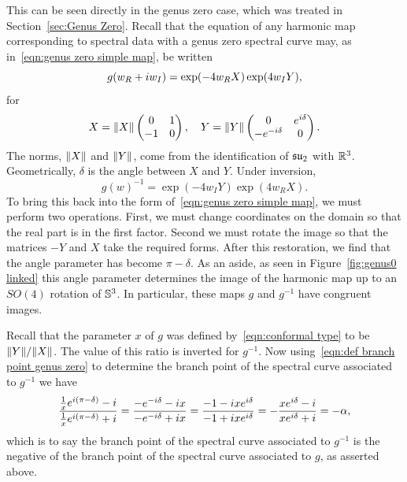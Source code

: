 \documentclass{article}
\begin{document}
This can be seen directly in the genus zero case, which was treated in Section~\ref{sec:Genus Zero}. Recall that the equation of any harmonic map corresponding to spectral data with a genus zero spectral curve may, as in~\eqref{eqn:genus zero simple map}, be written
\[
g(w_R + \iu w_I) = \exp (-4w_R X) \exp (4w_I Y),
\]
for
\[
X = \norm{X}\begin{pmatrix}
0 & 1 \\
-1 & 0
\end{pmatrix}, \quad
Y = \norm{Y}\begin{pmatrix}
0 & e^{\iu \delta} \\
-e^{-\iu \delta} & 0
\end{pmatrix}.
\]
The norms, $\norm{X}$ and $\norm{Y}$, come from the identification of $\su_2$ with $\R^3$. Geometrically, $\delta$ is the angle between $X$ and $Y$. Under inversion,
\[
g(w)^{-1} = \exp (-4w_I Y) \exp (4w_R X).
\]
To bring this back into the form of~\eqref{eqn:genus zero simple map}, we must perform two operations. First, we must change coordinates on the domain so that the real part is in the first factor. 
Second we must rotate the image so that the matrices $-Y$ and $X$ take the required forms. After this restoration, we find that the angle parameter has become $\pi-\delta$. As an aside, as seen in Figure~\ref{fig:genus0 linked} this angle parameter determines the image of the harmonic map up to an $SO(4)$ rotation of $\S^3$. In particular, these maps $g$ and $g^{-1}$ have congruent images.

Recall that the parameter $x$ of $g$ was defined by~\eqref{eqn:conformal type} to be $\norm{Y}/\norm{X}$. The value of this ratio is inverted for $g^{-1}$. Now using~\eqref{eqn:def branch point genus zero} to determine the branch point of the spectral curve associated to $g^{-1}$ we have
\[
\frac{\frac{1}{x} e^{\iu (\pi-\delta)} - \iu}{\frac{1}{x} e^{\iu (\pi-\delta)} + \iu}
= \frac{-e^{-\iu \delta} - \iu x}{-e^{-\iu \delta} + \iu x}
= \frac{-1 - \iu x e^{\iu \delta}}{-1 + \iu x e^{\iu \delta}}
= -\frac{x e^{\iu \delta}-\iu}{x e^{\iu \delta} + \iu} = -\alpha,
\]
which is to say the branch point of the spectral curve associated to $g^{-1}$ is the negative of the branch point of the spectral curve associated to $g$, as asserted above.
\end{document}
